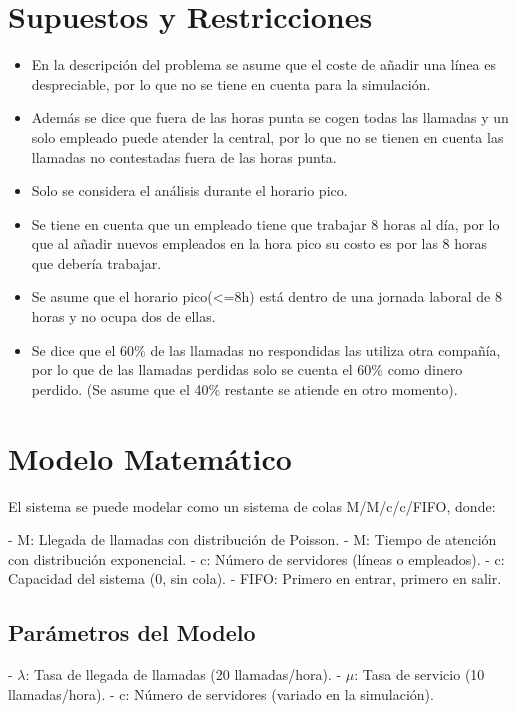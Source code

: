 \documentclass{article}
\begin{document}
\section{Supuestos y Restricciones}
\begin{itemize}
    \item En la descripción del problema se asume que el coste de añadir una línea es despreciable, por lo que no se tiene en cuenta para la simulación.
    \item Además se dice que fuera de las horas punta se cogen todas las llamadas y un solo empleado puede atender la central, por lo que no se tienen en cuenta las llamadas no contestadas fuera de las horas punta. 
    \item Solo se considera el análisis durante el horario pico.
    \item Se tiene en cuenta que un empleado tiene que trabajar 8 horas al día, por lo que al añadir nuevos empleados en la hora pico su costo es por las 8 horas que debería trabajar.
    \item Se asume que el horario pico(<=8h) está dentro de una jornada laboral de 8 horas y no ocupa dos de ellas.
    \item Se dice que el 60\% de las llamadas no respondidas las utiliza otra compañía, por lo que de las llamadas perdidas solo se cuenta el 60\% como dinero perdido. (Se asume que el 40\% restante se atiende en otro momento).
\end{itemize}


\section{Modelo Matemático}

El sistema se puede modelar como un sistema de colas M/M/c/c/FIFO, donde:

- M: Llegada de llamadas con distribución de Poisson.
- M: Tiempo de atención con distribución exponencial.
- c: Número de servidores (líneas o empleados).
- c: Capacidad del sistema (0, sin cola).
- FIFO: Primero en entrar, primero en salir.


\subsection{Parámetros del Modelo}

- $\lambda$: Tasa de llegada de llamadas (20 llamadas/hora).
- $\mu$: Tasa de servicio (10 llamadas/hora).
- c: Número de servidores (variado en la simulación).
\end{document}
